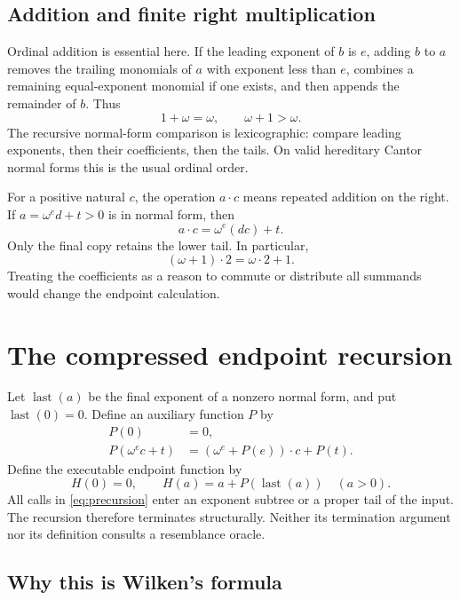 \documentclass[11pt]{article}
\begin{document}
\subsection{Addition and finite right multiplication}

Ordinal addition is essential here. If the leading exponent of $b$ is
$e$, adding $b$ to $a$ removes the trailing monomials of $a$ with
exponent less than $e$, combines a remaining equal-exponent monomial
if one exists, and then appends the remainder of $b$. Thus
\[
 1+\omega=\omega,\qquad \omega+1>\omega.
\]
The recursive normal-form comparison is lexicographic: compare leading
exponents, then their coefficients, then the tails. On valid hereditary
Cantor normal forms this is the usual ordinal order.

For a positive natural $c$, the operation $a\cdot c$ means repeated
addition on the right. If $a=\omega^e d+t>0$ is in normal form, then
\[
 a\cdot c=\omega^e(dc)+t.
\]
Only the final copy retains the lower tail. In particular,
\begin{equation}\label{eq:noncommutative}
 (\omega+1)\cdot2=\omega\cdot2+1.
\end{equation}
Treating the coefficients as a reason to commute or distribute all
summands would change the endpoint calculation.

\section{The compressed endpoint recursion}

Let $\operatorname{last}(a)$ be the final exponent of a nonzero normal
form, and put $\operatorname{last}(0)=0$. Define an auxiliary function
$P$ by
\begin{align}
 P(0)&=0,\label{eq:pzero}\\
 P(\omega^e c+t)&=(\omega^e+P(e))\cdot c+P(t).
 \label{eq:precursion}
\end{align}
Define the executable endpoint function by
\begin{equation}\label{eq:h}
 H(0)=0,\qquad H(a)=a+P(\operatorname{last}(a))\quad(a>0).
\end{equation}
All calls in \eqref{eq:precursion} enter an exponent subtree or a proper
tail of the input. The recursion therefore terminates structurally.
Neither its termination argument nor its definition consults a
resemblance oracle.

\subsection{Why this is Wilken's formula}
\end{document}
